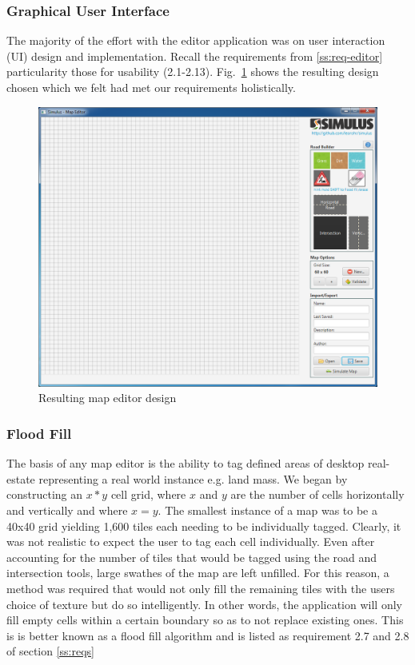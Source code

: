 \subsubsection{Graphical User Interface}
The majority of the effort with the editor application was on user interaction (UI) design and implementation. Recall the requirements from \ref{ss:req-editor} particularity those for usability (2.1-2.13). Fig.~\ref{fig:finalMapEditor} shows the resulting design chosen which we felt had met our requirements holistically.


\begin{figure}[h]
	\begin{center}
			\includegraphics[scale=0.45]{img/mapEditorFinal.png}
		\caption{Resulting map editor design}
		\label{fig:finalMapEditor}
	\end{center}
\end{figure}

\subsubsection{Flood Fill}
The basis of any map editor is the ability to tag defined areas of desktop real-estate representing a real world instance e.g. land mass. We began by constructing an $x*y$ cell grid, where $x$ and $y$ are the number of cells horizontally and vertically and where $x=y$. The smallest instance of a map was to be a 40x40 grid yielding 1,600 tiles each needing to be individually tagged. Clearly, it was not realistic to expect the user to tag each cell individually. Even after accounting for the number of tiles that would be tagged using the road and intersection tools, large swathes of the map are left unfilled.  
For this reason, a method was required that would not only fill the remaining tiles with the users choice of texture but do so intelligently. In other words, the application will only fill empty cells within a certain boundary so as to not replace existing ones. This is is better known as a flood fill algorithm and is listed as requirement 2.7 and 2.8 of section \ref{ss:reqs}

